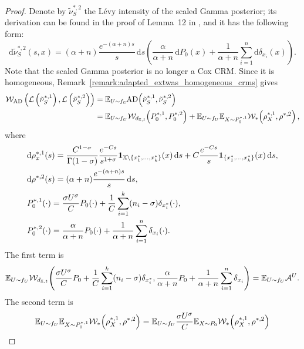 \begin{proof}
\vspace{-\topsep}
    Denote by $\tilde{\nu}^{*,2}_{S}$ the L\'evy intensity of the scaled Gamma posterior; its derivation can be found in the proof of Lemma~12 in \cite{catalano2026merging}, and it has the following form:
    \[
    \mathrm{d}\tilde{\nu}^{*,2}_{S}(s,x) = (\alpha + n)\frac{e^{-(\alpha + n)s}}{s}\,\mathrm{d}s\left( \frac{\alpha}{\alpha + n}\,\mathrm{d}P_0(x) + \frac{1}{\alpha + n}\sum_{i = 1}^n \mathrm{d}\delta_{x_i}(x) \right).
    \]
    Note that the scaled Gamma posterior is no longer a Cox CRM. Since it is homogeneous, Remark~\ref{remark:adapted_extwas_homogeneous_crms} gives
    \begin{align*}
    \mathcal{W}_{\mathrm{AD}}\left( \mathcal{L}\left(\tilde{\nu}^{*,1}_{S}\right),  \mathcal{L}\left(\tilde{\nu}^{*,2}_{S}\right) \right) &= \mathbb{E}_{U \sim f_U}\!\mathrm{AD}\!\left(\tilde{\nu}^{*,1}_{S}, \tilde{\nu}^{*,2}_{S}\right) \\
    &= \mathbb{E}_{U \sim f_U}\mathcal{W}_{d_{\mathbb{X},t}}\!\left(P_0^{*,1}, P_0^{*,2} \right) + \mathbb{E}_{U \sim f_U}\mathbb{E}_{X \sim P_0^{*,1}}\mathcal{W}_*\!\left(\rho_X^{*,1} , \rho^{*,2}\right),
    \end{align*}
    where
    \begin{align*}
        & \mathrm{d}\rho_x^{*,1}(s) = \frac{C^{1-\sigma}}{\Gamma(1-\sigma)}\frac{e^{-Cs}}{s^{1+\sigma}}\mathbf{1}_{\mathbb{X} \setminus\{x_1^*,\dots, x_k^*\}}(x)\,\mathrm{d}s 
        + C\frac{e^{-Cs}}{s}\mathbf{1}_{\{x_1^*,\dots, x_k^*\}}(x)\,\mathrm{d}s, \\
        & \mathrm{d}\rho^{*,2}(s) = (\alpha + n)\frac{e^{-(\alpha + n)s}}{s}\,\mathrm{d}s, \\
        & P_0^{*,1}(\cdot) = \frac{\sigma U^\sigma}{C} P_0(\cdot) + \frac{1}{C}\sum_{i = 1}^k (n_i - \sigma) \delta_{x_i^*}(\cdot), \\
        & P_0^{*,2}(\cdot) = \frac{\alpha}{\alpha + n} P_0(\cdot) + \frac{1}{\alpha + n}\sum_{i = 1}^n \delta_{x_i}(\cdot).
    \end{align*}
    The first term is
    \[
    \mathbb{E}_{U \sim f_U}\mathcal{W}_{d_{\mathbb{X},t}}\!\left(\frac{\sigma U^\sigma}{C}P_0 + \frac{1}{C}\sum_{i = 1}^{k}(n_i - \sigma) \delta_{x_i^*},
                         \frac{\alpha}{\alpha + n}P_0 + \frac{1}{\alpha + n}\sum_{i = 1}^n\delta_{x_i}\right) = \mathbb{E}_{U \sim f_U} \mathcal{A}^U.
    \]
    The second term is
    \begin{align*}
        \E_{U \sim f_U}\E_{X \sim P_0^{*,1}}\wext\!\left(\rho_X^{*,1} , \rho^{*,2}\right) & = \E_{U \sim f_U} \frac{\sigma U^\sigma}{C}\E_{X \sim P_0}\wext\!\left(\rho_X^{*,1} , \rho^{*,2} \right)\\ 

\end{align*}
\end{proof}
